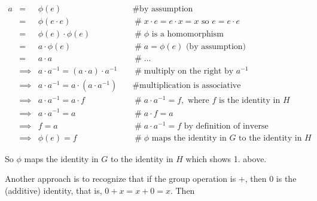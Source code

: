 \documentclass[11pt, oneside]{article}   	%
\theoremstyle{definition}
\begin{document}
\begin{equation*}
\begin{array}{rcll}
a 
&=& \phi(e)                                                                  &\quad \mathrel{\#}  \text{by assumption}   \\
&=& \phi(e \cdot e)                                                       &\quad \mathrel{\#} x \cdot e = e \cdot x = x \text{ so } e = e \cdot e   \\
&=& \phi(e) \cdot \phi(e)                                              &\quad \mathrel{\#} \text{$\phi$ is a homomorphism}\\
&=& a \cdot \phi(e)                                                       &\quad \mathrel{\#} a = \phi(e)  \text{ (by assumption)}   \\
&=& a \cdot a                                                               &\quad \mathrel{\#} \hdots \\
&\implies& a \cdot a^{-1} =  (a \cdot a)  \cdot a^{-1}    &\quad \mathrel{\#} \text{multiply on the right by  $a^{-1}$} \\
&\implies& a \cdot a^{-1} =  a \cdot (a \cdot a^{-1})     &\quad \mathrel{\#} \text{multiplication is associative} \\
&\implies& a \cdot a^{-1} =  a \cdot  f                           &\quad \mathrel{\#} a \cdot a^{-1} = f, \text{ where $f$ is the identity in $H$} \\
&\implies& a \cdot a^{-1} =  a                                       &\quad \mathrel{\#} a \cdot  f  = a \\
&\implies& f = a                                                            &\quad \mathrel{\#} a \cdot a^{-1} = f  \text{ by definition of inverse} \\
&\implies& \phi(e) =  f                                                   &\quad \mathrel{\#} \text{$\phi$ maps the identity in $G$ to the identity in $H$}
\end{array}
\end{equation*}

\bigskip
\noindent
So $\phi$ maps the identity in $G$ to the identity in $H$ which shows 1. above.

\bigskip
\noindent
Another approach is to recognize that if the group operation is $+$, then $0$ is the (additive) identity, that is, $0 + x = x + 0 = x$. Then
\end{document}
